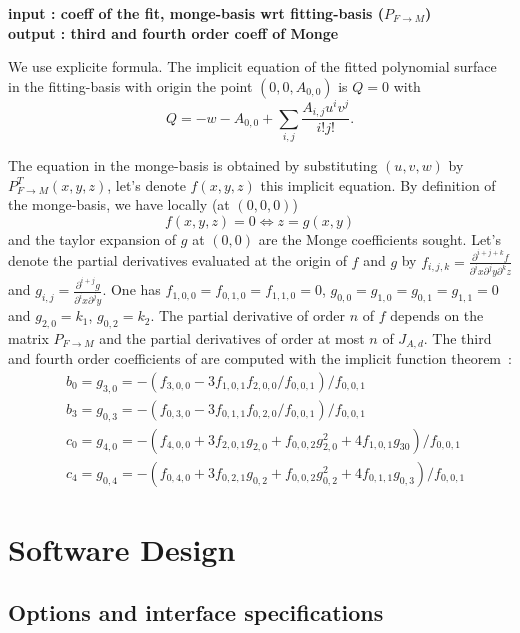 {\bf input : coeff of the fit, monge-basis wrt fitting-basis ($P_{F
\rightarrow M}$)\\ 
output : third and fourth order coeff of Monge}

We use explicite formula. The implicit equation of the fitted
polynomial surface in the fitting-basis with origin the point
$(0,0,A_{0,0})$ is $Q=0$ with
\begin{equation}
Q=-w-A_{0,0}  +\sum_{i,j}\frac{A_{i,j}u^iv^j}{i!j!}.
\end{equation}

The equation in the monge-basis is obtained by substituting $(u,v,w)$
by $P^T_{F\rightarrow M}(x,y,z)$, let's denote $f(x,y,z)$ this implicit
equation. By definition of the monge-basis, we have locally (at
$(0,0,0)$)
\begin{equation}
f(x,y,z)=0 \Leftrightarrow z=g(x,y)
\end{equation}
and the taylor expansion of $g$ at $(0,0)$ are the Monge coefficients
sought.
%
Let's denote the partial derivatives evaluated at the origin of $f$
and $g$ by $f_{i,j,k}=\frac{\partial^{i+j+k}f}{\partial^ix
\partial^jy \partial^kz}$ and $g_{i,j}=\frac{\partial^{i+j}g}{\partial^ix
\partial^jy}$. One has $f_{1,0,0}=f_{0,1,0}=f_{1,1,0}=0$,
$g_{0,0}=g_{1,0}=g_{0,1}=g_{1,1}=0$ and $g_{2,0}=k_1$,
$g_{0,2}=k_2$. The partial derivative of order $n$ of $f$ depends on
the matrix $P_{F\rightarrow M}$ and the partial derivatives of order
at most $n$ of $J_{A,d}$. The third and fourth order coefficients of are
computed with the implicit function theorem~:
\begin{eqnarray*}
&b_0=g_{3,0}=-(f_{3,0,0}-3f_{1,0,1}f_{2,0,0}/f_{0,0,1})/f_{0,0,1}\\
&b_3=g_{0,3}=-(f_{0,3,0}-3f_{0,1,1}f_{0,2,0}/f_{0,0,1})/f_{0,0,1}\\
&c_0=g_{4,0}=-(f_{4,0,0}+3f_{2,0,1}g_{2,0}+f_{0,0,2}g_{2,0}^2
+4f_{1,0,1}g_{30})/f_{0,0,1}\\
&c_4=g_{0,4}=-(f_{0,4,0}+3f_{0,2,1}g_{0,2}+f_{0,0,2}g_{0,2}^2
+4f_{0,1,1}g_{0,3})/f_{0,0,1}
\end{eqnarray*} 

\section{Software Design}
\subsection{Options and interface specifications}

